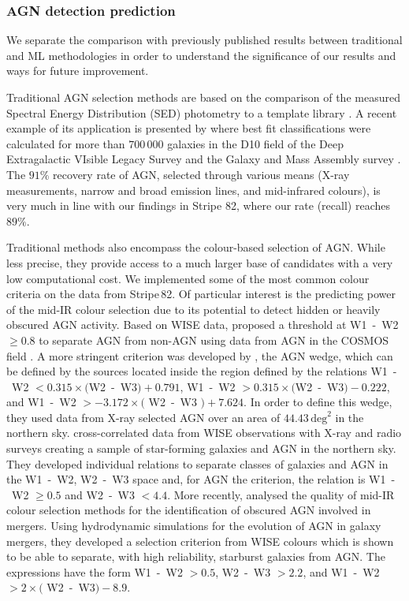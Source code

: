 \documentclass{aa}
\begin{document}
\subsubsection{AGN detection prediction}\label{sec:previous_AGN_detection}

We separate the comparison with previously published results between traditional and ML methodologies in order to understand the significance of our results and ways for future improvement.

Traditional AGN selection methods are based on the comparison of the measured Spectral Energy Distribution (SED) photometry to a template library \citep{2011Ap&SS.331....1W}. A recent example of its application is presented by  \citet{2022MNRAS.509.4940T} where best fit classifications were calculated for more than $700\,000$ galaxies in the D10 field of the Deep Extragalactic VIsible Legacy Survey \citep[DEVILS;][]{2018MNRAS.480..768D} and the Galaxy and Mass Assembly survey \citep[GAMA;][]{2011MNRAS.413..971D, 2015MNRAS.452.2087L}.
The $91 \%$ recovery rate of AGN, selected through various means (X-ray measurements, narrow and broad emission lines, and mid-infrared colours), is very much in line with our findings in Stripe 82, where our rate (recall) reaches $89 \%$.

Traditional methods also encompass the colour-based selection of AGN. While less precise, they provide access to a much larger base of candidates with a very low computational cost. We implemented some of the most common colour criteria on the data from Stripe\,82.
Of particular interest is the predicting power of the mid-IR colour selection due to its potential to detect hidden or heavily obscured AGN activity. 
 Based on WISE \citep{2010AJ....140.1868W} data, \citet[][S12]{2012ApJ...753...30S} proposed a threshold at W1~-~W2 $\geq 0.8$ to separate AGN from non-AGN using data from AGN in the COSMOS field \citep{2007ApJS..172....1S}.
A more stringent criterion was developed by \citet[][M12]{2012MNRAS.426.3271M}, the AGN wedge, which can be defined by the sources located inside the region defined by the relations W1~-~W2 $< 0.315 \times($W2~-~W3$)+ 0.791$, W1~-~W2 $> 0.315 \times($W2~-~W3$)- 0.222$, and W1~-~W2 $> -3.172 \times($ W2~-~W3 $)+ 7.624$. In order to define this wedge, they used data from X-ray selected AGN over an area of $44.43\, \mathrm{deg}^{2}$ in the northern sky.
\citet[][M16]{2016MNRAS.462.2631M} cross-correlated data from WISE observations with X-ray and radio surveys creating a sample of star-forming galaxies and AGN in the northern sky. They developed individual relations to separate classes of galaxies and AGN in the W1~-~W2, W2~-~W3 space and, for AGN the criterion, the relation is  W1~-~W2 $\geq 0.5$ and W2~-~W3 $< 4.4$.
More recently, \citet[][B18]{2018MNRAS.478.3056B} analysed the quality of mid-IR colour selection methods for the identification of obscured AGN involved in mergers. Using hydrodynamic simulations for the evolution of AGN in galaxy mergers, they developed a selection criterion from WISE colours which is shown to be able to separate, with high reliability, starburst galaxies from AGN. The expressions have the form W1~-~W2 $> 0.5$, W2~-~W3 $> 2.2$, and W1~-~W2 $> 2 \times($ W2~-~W3$) -8.9$.
\end{document}
